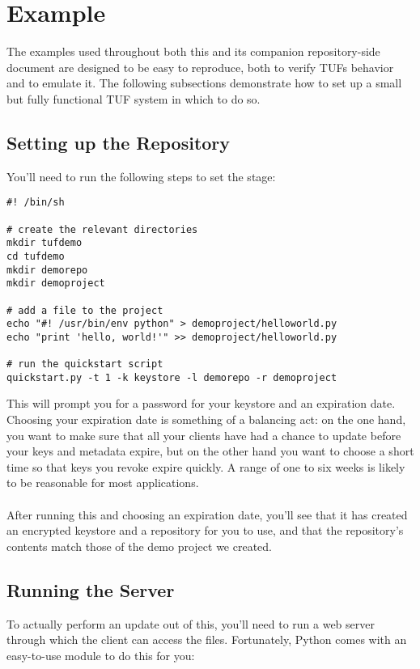 \documentclass{article}
\begin{document}
\section{Example}
The examples used throughout both this and its companion repository-side document
are designed to be easy to reproduce, both to verify TUFs behavior and to emulate
it. The following subsections demonstrate how to set up a small but fully
functional TUF system in which to do so.

\subsection{Setting up the Repository}
You'll need to run the following steps to set the stage:

\begin{lstlisting}
#! /bin/sh

# create the relevant directories
mkdir tufdemo
cd tufdemo
mkdir demorepo
mkdir demoproject

# add a file to the project
echo "#! /usr/bin/env python" > demoproject/helloworld.py
echo "print 'hello, world!'" >> demoproject/helloworld.py

# run the quickstart script
quickstart.py -t 1 -k keystore -l demorepo -r demoproject
\end{lstlisting}

This will prompt you for a password for your keystore and an expiration date.
Choosing your expiration date is something of a balancing act: on the one hand,
you want to make sure that all your clients have had a chance to update before
your keys and metadata expire, but on the other hand you want to choose a short
time so that keys you revoke expire quickly. A range of one to six weeks is likely
to be reasonable for most applications.
\\\\
After running this and choosing an expiration date, you'll see that it has created 
an encrypted keystore and a repository for you to use, and that the repository's 
contents match those of the demo project we created.

\subsection{Running the Server}
To actually perform an update out of this, you'll need to run a web server through
which the client can access the files. Fortunately, Python comes with an easy-to-use
module to do this for you:
\end{document}
